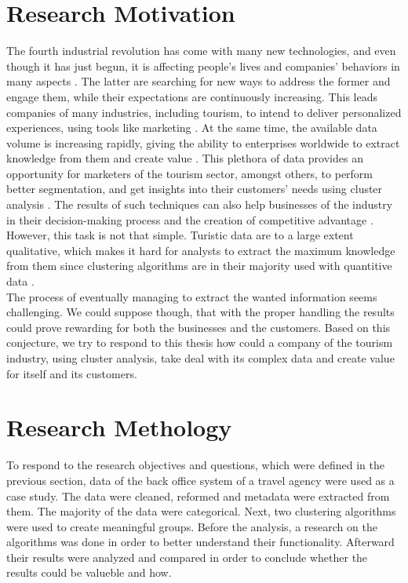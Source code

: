 \section{Research Motivation}
The fourth industrial revolution has come with many new technologies, and even though it has just begun, it is affecting people's lives and companies' behaviors in many aspects \autocite{revolution}. The latter are searching for new ways to address the former and engage them, while their expectations are continuously increasing. This leads companies of many industries, including tourism, to intend to deliver personalized experiences, using tools like marketing \autocite{engagement}. At the same time, the available data volume is increasing rapidly, giving the ability to enterprises worldwide to extract knowledge from them and create value \autocite{bigdata}.
This plethora of data provides an opportunity for marketers of the tourism sector, amongst others, to perform better segmentation, and get insights into their customers' needs using cluster analysis \autocite{fuzzyturism}. The results of such techniques can also help businesses of the industry in their decision-making process and the creation of competitive advantage \autocite{advantage}. However, this task is not that simple. Turistic data are to a large extent qualitative, which makes it hard for analysts to extract the maximum knowledge from them since clustering algorithms are in their majority used with quantitive data \autocite{categorical}. \\
The process of eventually managing to extract the wanted information seems challenging. We could suppose though, that with the proper handling the results could prove rewarding for both the businesses and the customers. Based on this conjecture, we try to respond to this thesis how could a company of the tourism industry, using cluster analysis, take deal with its complex data and create value for itself and its customers.
\section{Research Methology}
To respond to the research objectives and questions, which were defined in the previous section, data of the back office system of a travel agency were used as a case study. The data were cleaned, reformed and metadata were extracted from them. The majority of the data were categorical. Next, two clustering algorithms were used to create meaningful groups. Before the analysis, a research on the algorithms was done in order to better understand their functionality. Afterward their results were analyzed and compared in order to conclude whether the results could be valueble and how.
